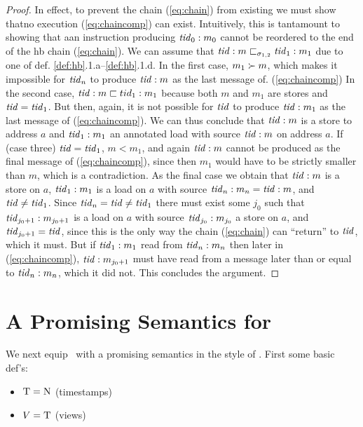 \begin{proof}
In effect, to prevent the chain (\ref{eq:chain}) from existing we must show thatno execution (\ref{eq:chaincomp}) can exist. Intuitively, this is tantamount to showing that aan instruction producing $\mathit{tid}_0: m_0$ cannot be reordered to the end of the hb chain (\ref{eq:chain}). We can assume that $\mathit{tid}: m\sqsubset_{\sigma_{1,2}}\mathit{tid}_1: m_1$ due to one of def. \ref{def:hb}.1.a--\ref{def:hb}.1.d. In the first case, $m_1\succ m$, which makes it impossible for
$\mathit{tid}_n$ to produce $\mathit{tid}:m$ as the last message of. (\ref{eq:chaincomp})
In the second case, $\mathit{tid}: m\sqsubset tid_1: m_1$ because both $m$ and
$m_1$ are stores and $\mathit{tid}=\mathit{tid}_1$. But then, again, it is not possible for
$\mathit{tid}$ to produce $\mathit{tid}:m_1$ as the last message of (\ref{eq:chaincomp}).
We can thus conclude that $\mathit{tid}: m$ is a store to address $a$
and $\mathit{tid}_1: m_1$ an annotated load with source $\mathit{tid}: m$ on address $a$. If (case three) $\mathit{tid}=\mathit{tid}_1$, $m<m_1$, and again $\mathit{tid}: m$ cannot be produced as the final message of (\ref{eq:chaincomp}), since then $m_1$ would have to be strictly smaller than $m$, which is a contradiction.
As the final case we obtain that $\mathit{tid}: m$ is a store on $a$, $\mathit{tid}_1: m_1$ is a load on $a$ with source $\mathit{tid}_n:m_n=\mathit{tid}:m$, and $\mathit{tid}\neq\mathit{tid}_1$. Since $\mathit{tid}_n=\mathit{tid} \neq \mathit{tid}_1$ there must exist some $j_0$ such that $\mathit{tid}_{j_0+1}: m_{j_0+1}$ is a load on $a$ with source $\mathit{tid}_{j_0}: m_{j_0}$ a store on $a$, and $\mathit{tid}_{j_0+1}=\mathit{tid}$, since this is the only way the chain (\ref{eq:chain}) can ``return'' to $\mathit{tid}$, which it must. But if $\mathit{tid}_1: m_1$ read from $\mathit{tid}_n: m_n$ then later in (\ref{eq:chaincomp}), $\mathit{tid}: m_{j_0+1}$ must have read from a message later than or equal to $\mathit{tid}_n: m_n$, which it did not. This concludes the argument.
\end{proof}
%
\section{A Promising Semantics for \MCMIL}

We next equip \MCMIL\ with a promising semantics in the style of
\cite{PulteEtAlPromising19}. First some basic def's:
\begin{itemize}
\item $\mbox{\sc T} = \mbox{\sc N}$ (timestamps)
\item $V = \mbox{\sc T}$ (views)
\end{itemize}



